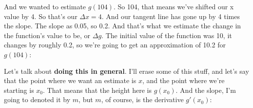 \documentclass[pdftex, brazil, 12pt, twoside]{article}
\begin{document}
And we wanted to estimate $g(104)$.
So 104, that means we've shifted our x value by 4.
So that's our $\Delta x = 4$.
And our tangent line has gone up by 4 times the slope.
The slope as 0.05, so 0.2.
And that's what we estimate the change in the function's value
to be, or $\Delta g$.
The initial value of the function was 10,
it changes by roughly 0.2, so we're
going to get an approximation of 10.2 for $g(104)$:

\begin{figure}[H]
  \begin{center}
  \end{center}
\end{figure}

Let's talk about \textbf{doing this in general}.
I'll erase some of this stuff, and let's say
that the point where we want an estimate is
$x$, and the point where we're starting is $x_0$.
That means that the height here is $g(x_0)$.
And the slope, I'm going to denoted it by $m$, but $m$,
of course, is the derivative $g'(x_0)$:

\begin{figure}[H]
  \begin{center}
  \end{center}
\end{figure}
\end{document}
